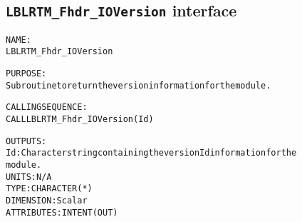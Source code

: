 \subsection{\texttt{LBLRTM\_Fhdr\_IOVersion} interface}
  \label{sec:LBLRTM_Fhdr_IOVersion_interface}
  \begin{alltt}
 
  NAME:
        LBLRTM_Fhdr_IOVersion
 
  PURPOSE:
        Subroutine to return the version information for the module.
 
  CALLING SEQUENCE:
        CALL LBLRTM_Fhdr_IOVersion( Id )
 
  OUTPUTS:
        Id:     Character string containing the version Id information for the
                module.
                UNITS:      N/A
                TYPE:       CHARACTER(*)
                DIMENSION:  Scalar
                ATTRIBUTES: INTENT(OUT)
 
  \end{alltt}

